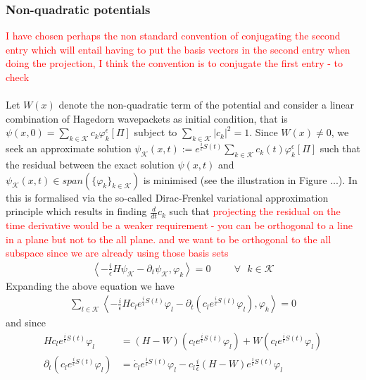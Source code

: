 \subsubsection{Non-quadratic potentials}
\textcolor{red}{I have chosen perhaps the 
non standard convention of conjugating the second entry which will entail having to 
put the basis vectors in the second entry when doing the projection, I think the convention 
is to conjugate the first entry - to check}
\\
\\
Let $W(x)$ denote the non-quadratic term of the potential and consider a linear 
combination of Hagedorn wavepackets as initial condition, that is 
$\psi(x,0) = \sum_{k \in \mathcal{K}} c_k \varphi_k^\epsilon[\Pi]$ subject 
to $\sum_{k \in \mathcal{K}} |c_k|^2 = 1$. 
Since $W(x) \not = 0$, we seek an approximate solution 
$\psi_{\mathcal{K}}(x,t) := e^{\frac{i}{\epsilon}S(t)}\sum_{k \in \mathcal{K}} c_k(t) \varphi_k^\epsilon[\Pi]$
such that the residual between the exact solution $\psi(x,t)$ and 
$\psi_{\mathcal{K}}(x,t) \in span(\{\varphi_k\}_{k \in \mathcal{K}})$ is minimised
(see the illustration in Figure ...).
In \cite{lubichQuantumClassicalMolecular2008} this is formalised via the so-called 
Dirac-Frenkel variational approximation principle which results in finding 
$\frac{d}{dt}c_k$ such that
\textcolor{red}{projecting the residual on the time derivative would be a weaker 
requirement - you can be orthogonal to a line in a plane but not to the all plane. and 
we want to be orthogonal to the all subspace since we are already using those 
basis sets}
\begin{equation}
  \begin{split}
  \left\langle 
    -\frac{i}{\epsilon} H \psi_{\mathcal{K}} - \partial_t \psi_{\mathcal{K}} , \varphi_{k} 
  \right\rangle  = 0 \hspace{1cm} 
\forall \text{ } k \in \mathcal{K}
  \end{split}
\end{equation}
Expanding the above equation we have 
\begin{equation}
  \begin{split}
    \sum_{l \in \mathcal{K}} 
    \left\langle 
      - \frac{i}{\epsilon} H c_l e^{\frac{i}{\epsilon}S(t)} \varphi_l - \partial_t (c_l e^{\frac{i}{\epsilon}S(t)} \varphi_l)
      , \varphi_k
    \right\rangle
    = 0
  \end{split}
\end{equation}
and since 
\begin{equation}
  \begin{split}
    H c_l e^{\frac{i}{\epsilon}S(t)} \varphi_l 
    &=
    (H - W) (c_l e^{\frac{i}{\epsilon}S(t)} \varphi_l) +
    W (c_l e^{\frac{i}{\epsilon}S(t)} \varphi_l)
  \\
    \partial_t (c_l e^{\frac{i}{\epsilon}S(t)} \varphi_l)
    &=
    \dot{c_l} e^{\frac{i}{\epsilon}S(t)} \varphi_l 
    - c_l\frac{i}{\epsilon}  (H - W)e^{\frac{i}{\epsilon}S(t)} \varphi_l 
  \end{split}
\end{equation}
